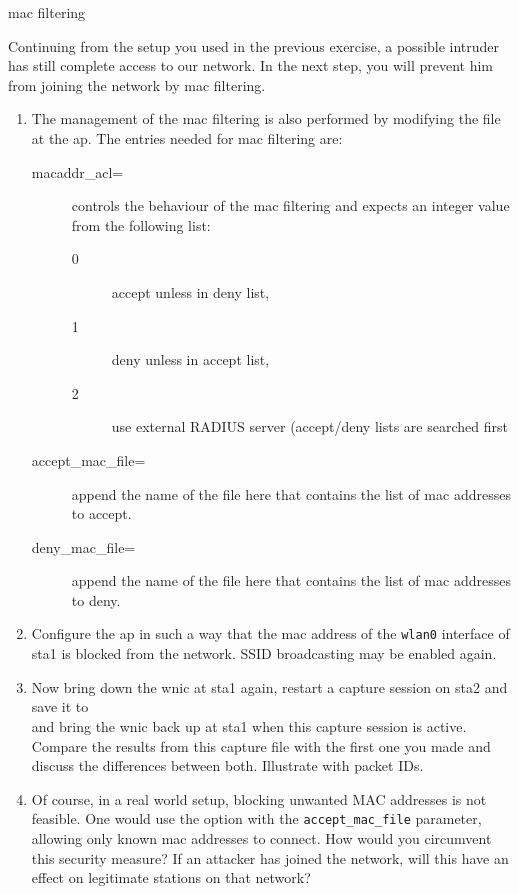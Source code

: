 \begin{exercise}{\ac{mac} filtering}

Continuing from the setup you used in the previous exercise, a possible intruder has still complete access to our network. In the next step, you will prevent him from joining the network by \ac{mac} filtering. 


\begin{enumerate}
	\item The management of the \ac{mac} filtering is also performed by modifying the  file at the \ac{ap}.  The entries needed for \ac{mac} filtering are:
	\begin{description}
		\item[macaddr\_acl=] controls the behaviour of the mac filtering  and expects an integer value from the following list:
		\begin{description}
			\item[0] accept unless in deny list,
			\item[1] deny unless in accept list,
			\item[2] use external RADIUS server (accept/deny lists are searched first
		\end{description}
		\item[accept\_mac\_file=] append the name of the file here that contains the list of \ac{mac} addresses to accept.
		\item[deny\_mac\_file=] append the name of the file here that contains the list of \ac{mac} addresses to deny.
	\end{description} 
	\item Configure the \ac{ap} in such a way that the \ac{mac} address of the \texttt{wlan0} interface of \ac{sta}1 is blocked from the network. SSID broadcasting may be enabled again.
	\item Now bring down the \ac{wnic} at \ac{sta}1 again, restart a capture session on \ac{sta}2 and save it to \\ and bring the \ac{wnic} back up at \ac{sta}1 when this capture session is active. Compare the results from this capture file with the first one you made and discuss the differences between both. Illustrate with packet IDs.\newline
	\begin{esolution}
	\end{esolution}
	\item Of course, in a real world setup, blocking unwanted MAC addresses is not feasible. One would use the option with the \texttt{accept\_mac\_file} parameter, allowing only known \ac{mac} addresses to connect. How would you circumvent this security measure? If an attacker has joined the network, will this have an effect on legitimate stations on that network?\newline
	\begin{esolution}
	\end{esolution}
\end{enumerate}

	
\end{exercise}




